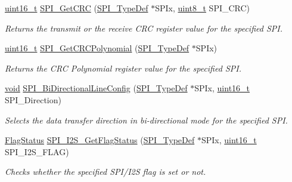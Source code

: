\begin{DoxyCompactItemize}
\hyperlink{_p_e___types_8h_a1f1825b69244eb3ad2c7165ddc99c956}{uint16\+\_\+t} \hyperlink{group___s_p_i___private___functions_ga4c81c193516e82cf0a2fdc149ef20cc6}{S\+P\+I\+\_\+\+Get\+C\+RC} (\hyperlink{struct_s_p_i___type_def}{S\+P\+I\+\_\+\+Type\+Def} $\ast$S\+P\+Ix, \hyperlink{_p_e___types_8h_aba7bc1797add20fe3efdf37ced1182c5}{uint8\+\_\+t} S\+P\+I\+\_\+\+C\+RC)
\begin{DoxyCompactList}\small\item\em Returns the transmit or the receive C\+RC register value for the specified S\+PI. \end{DoxyCompactList}\item 
\hyperlink{_p_e___types_8h_a1f1825b69244eb3ad2c7165ddc99c956}{uint16\+\_\+t} \hyperlink{group___s_p_i___private___functions_ga80fb9374cfce670f29128bb78568353f}{S\+P\+I\+\_\+\+Get\+C\+R\+C\+Polynomial} (\hyperlink{struct_s_p_i___type_def}{S\+P\+I\+\_\+\+Type\+Def} $\ast$S\+P\+Ix)
\begin{DoxyCompactList}\small\item\em Returns the C\+RC Polynomial register value for the specified S\+PI. \end{DoxyCompactList}\item 
\hyperlink{usb__devapi_8h_afabf60e7f57651d6d595a02c75f07cd0}{void} \hyperlink{group___s_p_i___private___functions_ga166171c421fc51da7714723524d41b45}{S\+P\+I\+\_\+\+Bi\+Directional\+Line\+Config} (\hyperlink{struct_s_p_i___type_def}{S\+P\+I\+\_\+\+Type\+Def} $\ast$S\+P\+Ix, \hyperlink{_p_e___types_8h_a1f1825b69244eb3ad2c7165ddc99c956}{uint16\+\_\+t} S\+P\+I\+\_\+\+Direction)
\begin{DoxyCompactList}\small\item\em Selects the data transfer direction in bi-\/directional mode for the specified S\+PI. \end{DoxyCompactList}\item 
\hyperlink{agilefox_2library_2inc_2stm32f10x__type_8h_a89136caac2e14c55151f527ac02daaff}{Flag\+Status} \hyperlink{group___s_p_i___private___functions_ga1bd785d129e09c5734a876c8f2767204}{S\+P\+I\+\_\+\+I2\+S\+\_\+\+Get\+Flag\+Status} (\hyperlink{struct_s_p_i___type_def}{S\+P\+I\+\_\+\+Type\+Def} $\ast$S\+P\+Ix, \hyperlink{_p_e___types_8h_a1f1825b69244eb3ad2c7165ddc99c956}{uint16\+\_\+t} S\+P\+I\+\_\+\+I2\+S\+\_\+\+F\+L\+AG)
\begin{DoxyCompactList}\small\item\em Checks whether the specified S\+P\+I/\+I2S flag is set or not. \end{DoxyCompactList}\item 

\end{DoxyCompactItemize}
